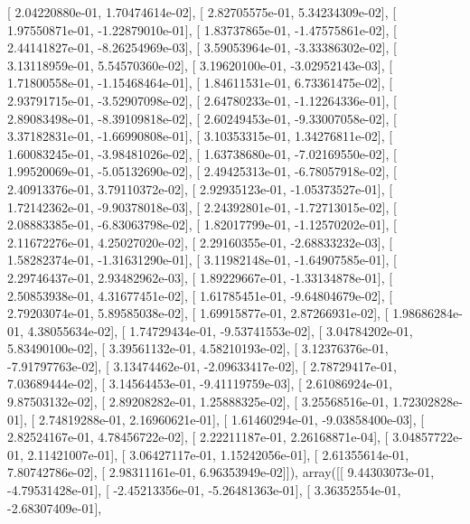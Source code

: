 \documentclass{article}
\begin{document}
       [  2.04220880e-01,   1.70474614e-02],
       [  2.82705575e-01,   5.34234309e-02],
       [  1.97550871e-01,  -1.22879010e-01],
       [  1.83737865e-01,  -1.47575861e-02],
       [  2.44141827e-01,  -8.26254969e-03],
       [  3.59053964e-01,  -3.33386302e-02],
       [  3.13118959e-01,   5.54570360e-02],
       [  3.19620100e-01,  -3.02952143e-03],
       [  1.71800558e-01,  -1.15468464e-01],
       [  1.84611531e-01,   6.73361475e-02],
       [  2.93791715e-01,  -3.52907098e-02],
       [  2.64780233e-01,  -1.12264336e-01],
       [  2.89083498e-01,  -8.39109818e-02],
       [  2.60249453e-01,  -9.33007058e-02],
       [  3.37182831e-01,  -1.66990808e-01],
       [  3.10353315e-01,   1.34276811e-02],
       [  1.60083245e-01,  -3.98481026e-02],
       [  1.63738680e-01,  -7.02169550e-02],
       [  1.99520069e-01,  -5.05132690e-02],
       [  2.49425313e-01,  -6.78057918e-02],
       [  2.40913376e-01,   3.79110372e-02],
       [  2.92935123e-01,  -1.05373527e-01],
       [  1.72142362e-01,  -9.90378018e-03],
       [  2.24392801e-01,  -1.72713015e-02],
       [  2.08883385e-01,  -6.83063798e-02],
       [  1.82017799e-01,  -1.12570202e-01],
       [  2.11672276e-01,   4.25027020e-02],
       [  2.29160355e-01,  -2.68833232e-03],
       [  1.58282374e-01,  -1.31631290e-01],
       [  3.11982148e-01,  -1.64907585e-01],
       [  2.29746437e-01,   2.93482962e-03],
       [  1.89229667e-01,  -1.33134878e-01],
       [  2.50853938e-01,   4.31677451e-02],
       [  1.61785451e-01,  -9.64804679e-02],
       [  2.79203074e-01,   5.89585038e-02],
       [  1.69915877e-01,   2.87266931e-02],
       [  1.98686284e-01,   4.38055634e-02],
       [  1.74729434e-01,  -9.53741553e-02],
       [  3.04784202e-01,   5.83490100e-02],
       [  3.39561132e-01,   4.58210193e-02],
       [  3.12376376e-01,  -7.91797763e-02],
       [  3.13474462e-01,  -2.09633417e-02],
       [  2.78729417e-01,   7.03689444e-02],
       [  3.14564453e-01,  -9.41119759e-03],
       [  2.61086924e-01,   9.87503132e-02],
       [  2.89208282e-01,   1.25888325e-02],
       [  3.25568516e-01,   1.72302828e-01],
       [  2.74819288e-01,   2.16960621e-01],
       [  1.61460294e-01,  -9.03858400e-03],
       [  2.82524167e-01,   4.78456722e-02],
       [  2.22211187e-01,   2.26168871e-04],
       [  3.04857722e-01,   2.11421007e-01],
       [  3.06427117e-01,   1.15242056e-01],
       [  2.61355614e-01,   7.80742786e-02],
       [  2.98311161e-01,   6.96353949e-02]]), array([[  9.44303073e-01,  -4.79531428e-01],
       [ -2.45213356e-01,  -5.26481363e-01],
       [  3.36352554e-01,  -2.68307409e-01],
\end{document}
